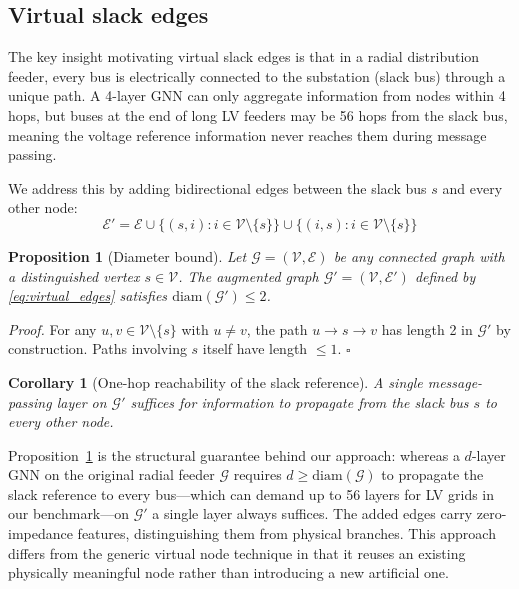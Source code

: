 \documentclass[preprint,review,12pt]{elsarticle}
\newtheorem{proposition}{Proposition}
\newtheorem{corollary}{Corollary}
\begin{document}
\subsection{Virtual slack edges}

The key insight motivating virtual slack edges is that in a radial distribution feeder, every bus is electrically connected to the substation (slack bus) through a unique path. A 4-layer GNN can only aggregate information from nodes within 4 hops, but buses at the end of long LV feeders may be 56 hops from the slack bus, meaning the voltage reference information never reaches them during message passing.

We address this by adding bidirectional edges between the slack bus $s$ and every other node:
\begin{equation}
\mathcal{E}' = \mathcal{E} \cup \{(s, i) : i \in \mathcal{V} \setminus \{s\}\} \cup \{(i, s) : i \in \mathcal{V} \setminus \{s\}\}
\label{eq:virtual_edges}
\end{equation}

\begin{proposition}[Diameter bound]
\label{prop:diameter}
Let $\mathcal{G} = (\mathcal{V}, \mathcal{E})$ be any connected graph with a distinguished vertex $s \in \mathcal{V}$. The augmented graph $\mathcal{G}' = (\mathcal{V}, \mathcal{E}')$ defined by \eqref{eq:virtual_edges} satisfies $\mathrm{diam}(\mathcal{G}') \leq 2$.
\end{proposition}

\emph{Proof.} For any $u, v \in \mathcal{V}\setminus\{s\}$ with $u \neq v$, the path $u \to s \to v$ has length 2 in $\mathcal{G}'$ by construction. Paths involving $s$ itself have length $\leq 1$. $\square$

\begin{corollary}[One-hop reachability of the slack reference]
\label{cor:onehop}
A single message-passing layer on $\mathcal{G}'$ suffices for information to propagate from the slack bus $s$ to every other node.
\end{corollary}

Proposition~\ref{prop:diameter} is the structural guarantee behind our approach: whereas a $d$-layer GNN on the original radial feeder $\mathcal{G}$ requires $d \geq \mathrm{diam}(\mathcal{G})$ to propagate the slack reference to every bus---which can demand up to 56 layers for LV grids in our benchmark---on $\mathcal{G}'$ a single layer always suffices. The added edges carry zero-impedance features, distinguishing them from physical branches. This approach differs from the generic virtual node technique \cite{b20} in that it reuses an existing physically meaningful node rather than introducing a new artificial one.
\end{document}
